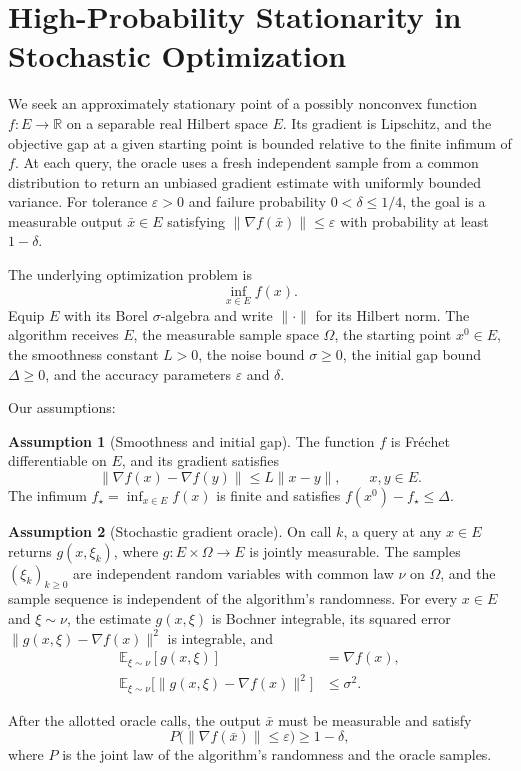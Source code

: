 \documentclass[10pt]{article}
\theoremstyle{definition}
\newtheorem{assumption}{Assumption}
\begin{document}
\section*{High-Probability Stationarity in Stochastic Optimization}
We seek an approximately stationary point of a possibly nonconvex function $f:E\to\mathbb{R}$ on a separable real Hilbert space $E$. Its gradient is Lipschitz, and the objective gap at a given starting point is bounded relative to the finite infimum of $f$. At each query, the oracle uses a fresh independent sample from a common distribution to return an unbiased gradient estimate with uniformly bounded variance. For tolerance $\varepsilon>0$ and failure probability $0<\delta\leq 1/4$, the goal is a measurable output $\bar{x}\in E$ satisfying $\|\nabla f(\bar{x})\|\leq\varepsilon$ with probability at least $1-\delta$.

The underlying optimization problem is
\[
\inf_{x\in E} f(x).
\]
Equip $E$ with its Borel $\sigma$-algebra and write $\|\cdot\|$ for its Hilbert norm. The algorithm receives $E$, the measurable sample space $\Omega$, the starting point $x^0\in E$, the smoothness constant $L>0$, the noise bound $\sigma\geq 0$, the initial gap bound $\Delta\geq 0$, and the accuracy parameters $\varepsilon$ and $\delta$.

Our assumptions:
\begin{assumption}[Smoothness and initial gap]
The function $f$ is Fr\'echet differentiable on $E$, and its gradient satisfies
\[
\|\nabla f(x)-\nabla f(y)\|\leq L\|x-y\|,\qquad x,y\in E.
\]
The infimum $f_\star=\inf_{x\in E}f(x)$ is finite and satisfies $f(x^0)-f_\star\leq\Delta$.
\end{assumption}

\begin{assumption}[Stochastic gradient oracle]
On call $k$, a query at any $x\in E$ returns $g(x,\xi_k)$, where $g:E\times\Omega\to E$ is jointly measurable. The samples $(\xi_k)_{k\geq 0}$ are independent random variables with common law $\nu$ on $\Omega$, and the sample sequence is independent of the algorithm's randomness. For every $x\in E$ and $\xi\sim\nu$, the estimate $g(x,\xi)$ is Bochner integrable, its squared error $\|g(x,\xi)-\nabla f(x)\|^2$ is integrable, and
\[
\begin{aligned}
\mathbb{E}_{\xi\sim\nu}[g(x,\xi)] &= \nabla f(x),\\
\mathbb{E}_{\xi\sim\nu}\bigl[\|g(x,\xi)-\nabla f(x)\|^2\bigr] &\leq \sigma^2.
\end{aligned}
\]
\end{assumption}

After the allotted oracle calls, the output $\bar{x}$ must be measurable and satisfy
\[
P\bigl(\|\nabla f(\bar{x})\|\leq\varepsilon\bigr)\geq 1-\delta,
\]
where $P$ is the joint law of the algorithm's randomness and the oracle samples.
\end{document}
